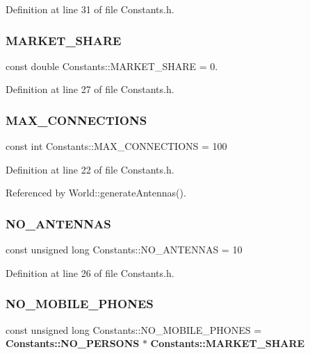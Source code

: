 Definition at line 31 of file Constants.\+h.

\mbox{\label{class_constants_ad4f5be7868fba7f3a27ae279d3e86263}} 
\subsubsection{MARKET\_SHARE}
{\footnotesize\ttfamily const double Constants\+::\+M\+A\+R\+K\+E\+T\+\_\+\+S\+H\+A\+RE = 0.\hspace{0.3cm}{\ttfamily [static]}}



Definition at line 27 of file Constants.\+h.

\mbox{\label{class_constants_ada41e181f9bb940f279578c1de5cf8e0}} 
\subsubsection{MAX\_CONNECTIONS}
{\footnotesize\ttfamily const int Constants\+::\+M\+A\+X\+\_\+\+C\+O\+N\+N\+E\+C\+T\+I\+O\+NS = 100\hspace{0.3cm}{\ttfamily [static]}}



Definition at line 22 of file Constants.\+h.



Referenced by World\+::generate\+Antennas().

\mbox{\label{class_constants_adaff5d12bdc013cbbaea116f56c8a94e}} 
\subsubsection{NO\_ANTENNAS}
{\footnotesize\ttfamily const unsigned long Constants\+::\+N\+O\+\_\+\+A\+N\+T\+E\+N\+N\+AS = 10\hspace{0.3cm}{\ttfamily [static]}}



Definition at line 26 of file Constants.\+h.

\mbox{\label{class_constants_a19c72b30528616a8b10ecf9ceb51a3fe}} 
\subsubsection{NO\_MOBILE\_PHONES}
{\footnotesize\ttfamily const unsigned long Constants\+::\+N\+O\+\_\+\+M\+O\+B\+I\+L\+E\+\_\+\+P\+H\+O\+N\+ES = \textbf{ Constants\+::\+N\+O\+\_\+\+P\+E\+R\+S\+O\+NS} $\ast$ \textbf{ Constants\+::\+M\+A\+R\+K\+E\+T\+\_\+\+S\+H\+A\+RE}\hspace{0.3cm}{\ttfamily [static]}}



